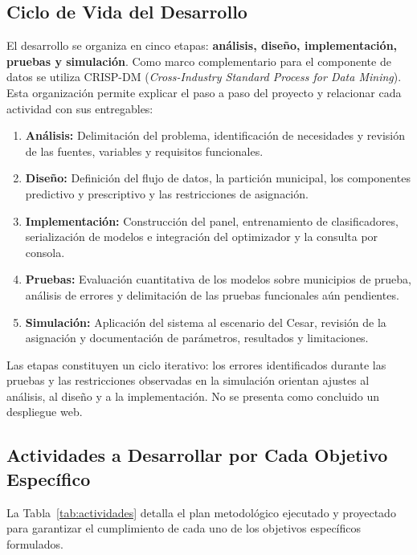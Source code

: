 \documentclass[12pt]{article}
\begin{document}
\subsection{Ciclo de Vida del Desarrollo}
El desarrollo se organiza en cinco etapas: \textbf{análisis, diseño, implementación, pruebas y simulación}. Como marco complementario para el componente de datos se utiliza CRISP-DM (\textit{Cross-Industry Standard Process for Data Mining}). Esta organización permite explicar el paso a paso del proyecto y relacionar cada actividad con sus entregables:
\begin{enumerate}
    \item \textbf{Análisis:} Delimitación del problema, identificación de necesidades y revisión de las fuentes, variables y requisitos funcionales.
    \item \textbf{Diseño:} Definición del flujo de datos, la partición municipal, los componentes predictivo y prescriptivo y las restricciones de asignación.
    \item \textbf{Implementación:} Construcción del panel, entrenamiento de clasificadores, serialización de modelos e integración del optimizador y la consulta por consola.
    \item \textbf{Pruebas:} Evaluación cuantitativa de los modelos sobre municipios de prueba, análisis de errores y delimitación de las pruebas funcionales aún pendientes.
    \item \textbf{Simulación:} Aplicación del sistema al escenario del Cesar, revisión de la asignación y documentación de parámetros, resultados y limitaciones.
\end{enumerate}
Las etapas constituyen un ciclo iterativo: los errores identificados durante las pruebas y las restricciones observadas en la simulación orientan ajustes al análisis, al diseño y a la implementación. No se presenta como concluido un despliegue web.

\subsection{Actividades a Desarrollar por Cada Objetivo Específico}
La Tabla~\ref{tab:actividades} detalla el plan metodológico ejecutado y proyectado para garantizar el cumplimiento de cada uno de los objetivos específicos formulados.
\end{document}
